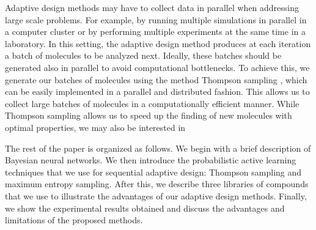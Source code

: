 Adaptive design methods may have to collect data in parallel when addressing large scale problems. 
For example, by running multiple simulations in parallel in a computer
cluster or by performing multiple experiments at the same time in a laboratory. 
In this setting, the adaptive design method produces at each iteration a batch of molecules to be analyzed next.
Ideally, these batches should be generated also in parallel to avoid computational bottlenecks. To achieve this, we generate our batches of molecules using the method Thompson sampling \cite{Thompson_1933}, which
can be easily implemented in a parallel and distributed fashion. This allows us to collect large batches of molecules in a
computationally efficient manner. While Thompson sampling allows us to speed up the finding of new molecules with optimal 
properties, we may also be interested in 

The rest of the paper is organized as follows. We begin with a brief description of Bayesian neural networks. We then introduce the probabilistic active learning techniques that we use for sequential adaptive design: Thompson sampling and maximum entropy sampling. After this, we describe three libraries of compounds that we use to illustrate the advantages of our adaptive design methods. Finally, we show the experimental results obtained and discuss the advantages and limitations of the proposed methods.
